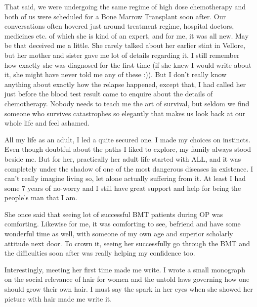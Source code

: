 That said, we were undergoing the same regime of high dose chemotherapy and both of us were scheduled for a Bone Marrow Transplant soon after. Our conversations often hovered just around treatment regime, hospital doctors, medicines etc. of which she is kind of an expert, and for me, it was all new. May be that deceived me a little. She rarely talked about her earlier stint in Vellore, but her mother and sister gave me lot of details regarding it. I still remember how exactly she was diagnosed for the first time (if she knew I would write about it, she might have never told me any of these :)). But I don't really know anything about exactly how the relapse happened, except that, I had called her just before the blood test result came to enquire about the details of chemotherapy. Nobody needs to teach me the art of survival, but seldom we find someone who survives catastrophes so elegantly that makes us look back at our whole life and feel ashamed.

All my life as an adult, I led a quite secured one. I made my choices on instincts. Even though doubtful about the paths I liked to explore, my family always stood beside me. But for her, practically her adult life started with ALL, and it was completely under the shadow of one of the most dangerous diseases in existence. I can't really imagine living so, let alone actually suffering from it. At least I had some 7 years of no-worry and I still have great support and help for being the people's man that I am.

She once said that seeing lot of successful BMT patients during OP was comforting. Likewise for me, it was comforting to see, befriend and have some wonderful time as well, with someone of my own age and superior scholarly attitude next door. To crown it, seeing her successfully go through the BMT and the difficulties soon after was really helping my confidence too.

Interestingly, meeting her first time made me write. I wrote a small monograph on the social relevance of hair for women and the untold laws governing how one should grow their own hair. I must say the spark in her eyes when she showed her picture with hair made me write it.

\newpage     
